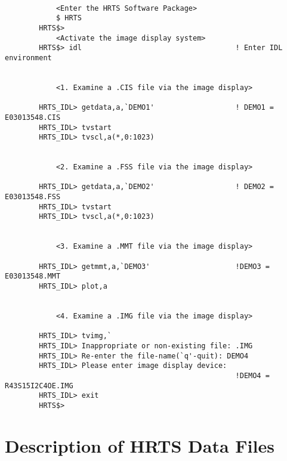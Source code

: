 \begin{verbatim}

            <Enter the HRTS Software Package>
            $ HRTS
        HRTS$>
            <Activate the image display system>
        HRTS$> idl                                    ! Enter IDL environment


            <1. Examine a .CIS file via the image display>

        HRTS_IDL> getdata,a,`DEMO1'                   ! DEMO1 = E03013548.CIS
        HRTS_IDL> tvstart
        HRTS_IDL> tvscl,a(*,0:1023)


            <2. Examine a .FSS file via the image display>

        HRTS_IDL> getdata,a,`DEMO2'                   ! DEMO2 = E03013548.FSS
        HRTS_IDL> tvstart
        HRTS_IDL> tvscl,a(*,0:1023)


            <3. Examine a .MMT file via the image display>

        HRTS_IDL> getmmt,a,`DEMO3'                    !DEMO3 = E03013548.MMT
        HRTS_IDL> plot,a


            <4. Examine a .IMG file via the image display>

        HRTS_IDL> tvimg,`
        HRTS_IDL> Inappropriate or non-existing file: .IMG
        HRTS_IDL> Re-enter the file-name(`q'-quit): DEMO4
        HRTS_IDL> Please enter image display device:
                                                      !DEMO4 = R43S15I2C4OE.IMG
        HRTS_IDL> exit
        HRTS$>

\end{verbatim}

\newpage

\section{Description of HRTS Data Files}

